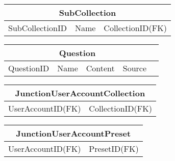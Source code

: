 \documentclass{article}
\begin{document}
\begin{figure}[h!]
\begin{subfigure}{0.2\textwidth}
\begin{tabular}{|c|c|}
            \hline
        \end{tabular}
        \vspace*{2em}
    \end{subfigure}
    \begin{subfigure}{0.4\textwidth}
        \begin{tabular}{|c|c|c|}
            \hline
            \multicolumn{3}{|c|}{SubCollection} \\
            \hline
            SubCollectionID & Name & CollectionID(FK) \\
            \hline
        \end{tabular}
        \vspace*{2em}
    \end{subfigure}
    \begin{subfigure}{0.3\textwidth}
        \begin{tabular}{|c|c|c|c|c|}
            \hline
            \multicolumn{4}{|c|}{Question} \\
            \hline
            QuestionID & Name & Content & Source \\
            \hline
        \end{tabular}
        \vspace*{2em}
    \end{subfigure}
    \begin{subfigure}{0.5\textwidth}
        \begin{tabular}{|c|c|}
            \hline
            \multicolumn{2}{|c|}{JunctionUserAccountCollection} \\
            \hline
            UserAccountID(FK) & CollectionID(FK) \\
            \hline
        \end{tabular}
        \vspace*{2em}
    \end{subfigure}
    \begin{subfigure}{0.5\textwidth}
        \begin{tabular}{|c|c|}
            \hline
            \multicolumn{2}{|c|}{JunctionUserAccountPreset} \\
            \hline
            UserAccountID(FK) & PresetID(FK) \\
            \hline
        \end{tabular}
        \vspace*{2em}
    \end{subfigure}
    \begin{subfigure}{0.5\textwidth}

\end{subfigure}
\end{figure}
\end{document}
